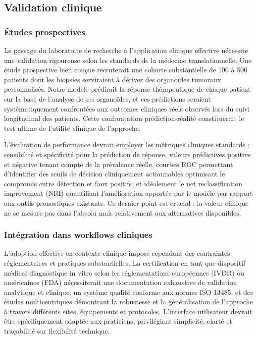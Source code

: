 \subsection{Validation clinique}

\subsubsection{Études prospectives}

Le passage du laboratoire de recherche à l'application clinique effective nécessite une validation rigoureuse selon les standards de la médecine translationnelle. Une étude prospective bien conçue recruterait une cohorte substantielle de 100 à 500 patients dont les biopsies serviraient à dériver des organoïdes tumoraux personnalisés. Notre modèle prédirait la réponse thérapeutique de chaque patient sur la base de l'analyse de ses organoïdes, et ces prédictions seraient systématiquement confrontées aux outcomes cliniques réels observés lors du suivi longitudinal des patients. Cette confrontation prédiction-réalité constituerait le test ultime de l'utilité clinique de l'approche.

L'évaluation de performance devrait employer les métriques cliniques standards : sensibilité et spécificité pour la prédiction de réponse, valeurs prédictives positive et négative tenant compte de la prévalence réelle, courbes ROC permettant d'identifier des seuils de décision cliniquement actionnables optimisant le compromis entre détection et faux positifs, et idéalement le net reclassification improvement (NRI) quantifiant l'amélioration apportée par le modèle par rapport aux outils pronostiques existants. Ce dernier point est crucial : la valeur clinique ne se mesure pas dans l'absolu mais relativement aux alternatives disponibles.

\subsubsection{Intégration dans workflows cliniques}

L'adoption effective en contexte clinique impose cependant des contraintes réglementaires et pratiques substantielles. La certification en tant que dispositif médical diagnostique in vitro selon les réglementations européennes (IVDR) ou américaines (FDA) nécessiterait une documentation exhaustive de validation analytique et clinique, un système qualité conforme aux normes ISO 13485, et des études multicentriques démontrant la robustesse et la généralisation de l'approche à travers différents sites, équipements et protocoles. L'interface utilisateur devrait être spécifiquement adaptée aux praticiens, privilégiant simplicité, clarté et traçabilité sur flexibilité technique.

